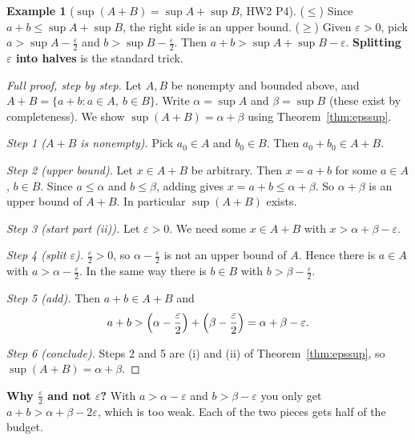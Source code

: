 \documentclass[11pt]{article}
\theoremstyle{definition}
\newtheorem{ex}[defn]{Example}
\newcommand{\eps}{\varepsilon}
\newcommand{\key}[1]{\textcolor{red!70!black}{\textbf{#1}}}
\begin{document}
\begin{ex}[$\sup(A+B)=\sup A+\sup B$, HW2 P4]
($\le$) Since $a+b\le\sup A+\sup B$, the right side is an upper bound.
($\ge$) Given $\eps>0$, pick $a>\sup A-\frac\eps2$ and
$b>\sup B-\frac\eps2$. Then $a+b>\sup A+\sup B-\eps$.
\key{Splitting $\eps$ into halves} is the standard trick.

\begin{proof}[Full proof, step by step]
Let $A,B$ be nonempty and bounded above, and
$A+B=\{a+b:a\in A,\ b\in B\}$. Write $\alpha=\sup A$ and $\beta=\sup B$
(these exist by completeness). We show $\sup(A+B)=\alpha+\beta$ using
Theorem~\ref{thm:epssup}.

\emph{Step 1 ($A+B$ is nonempty).} Pick $a_0\in A$ and $b_0\in B$. Then
$a_0+b_0\in A+B$.

\emph{Step 2 (upper bound).} Let $x\in A+B$ be arbitrary. Then $x=a+b$ for
some $a\in A$, $b\in B$. Since $a\le\alpha$ and $b\le\beta$, adding gives
$x=a+b\le\alpha+\beta$. So $\alpha+\beta$ is an upper bound of $A+B$. In
particular $\sup(A+B)$ exists.

\emph{Step 3 (start part (ii)).} Let $\eps>0$. We need some $x\in A+B$
with $x>\alpha+\beta-\eps$.

\emph{Step 4 (split $\eps$).} $\frac\eps2>0$, so $\alpha-\frac\eps2$ is not
an upper bound of $A$. Hence there is $a\in A$ with $a>\alpha-\frac\eps2$.
In the same way there is $b\in B$ with $b>\beta-\frac\eps2$.

\emph{Step 5 (add).} Then $a+b\in A+B$ and
\[
a+b>\Bigl(\alpha-\frac\eps2\Bigr)+\Bigl(\beta-\frac\eps2\Bigr)=\alpha+\beta-\eps.
\]

\emph{Step 6 (conclude).} Steps 2 and 5 are (i) and (ii) of
Theorem~\ref{thm:epssup}, so $\sup(A+B)=\alpha+\beta$.
\end{proof}
\noindent\key{Why $\frac\eps2$ and not $\eps$?} With $a>\alpha-\eps$ and
$b>\beta-\eps$ you only get $a+b>\alpha+\beta-2\eps$, which is too weak.
Each of the two pieces gets half of the budget.
\end{ex}
\end{document}
